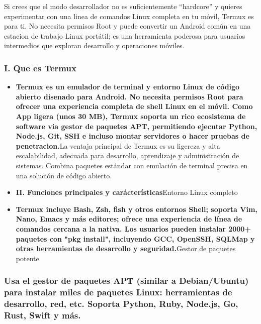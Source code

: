 
Si crees que el modo desarrollador no es suficientemente “hardcore” y quieres experimentar con una linea de comandos Linux completa en tu móvil, Termux es para ti. No necesita permisos Root y puede convertir un Android común en una estacion de trabajo Linux portátil; es una herramienta poderosa para usuarios intermedios que exploran desarrollo y operaciones móviles.

\subsubsection*{I. Que es Termux}

\begin{itemize}
  \item \textbf{Termux es un emulador de terminal y entorno Linux de código abierto disenado para Android. No necesita permisos Root para ofrecer una experiencia completa de shell Linux en el móvil. Como App ligera (unos 30 MB), Termux soporta un rico ecosistema de software via gestor de paquetes APT, permitiendo ejecutar Python, Node.js, Git, SSH e incluso montar servidores o hacer pruebas de penetracion.}La ventaja principal de Termux es su ligereza y alta escalabilidad, adecuada para desarrollo, aprendizaje y administración de sistemas. Combina paquetes estándar con emulación de terminal precisa en una solución de código abierto.
  \item \textbf{II. Funciones principales y carácterísticas}Entorno Linux completo
  \item \textbf{Termux incluye Bash, Zsh, fish y otros entornos Shell; soporta Vim, Nano, Emacs y más editores; ofrece una experiencia de línea de comandos cercana a la nativa. Los usuarios pueden instalar 2000+ paquetes con "pkg install", incluyendo GCC, OpenSSH, SQLMap y otras herramientas de desarrollo y seguridad.}Gestor de paquetes potente
\end{itemize}

\subsubsection*{Usa el gestor de paquetes APT (similar a Debian/Ubuntu) para instalar miles de paquetes Linux: herramientas de desarrollo, red, etc. Soporta Python, Ruby, Node.js, Go, Rust, Swift y más.}

